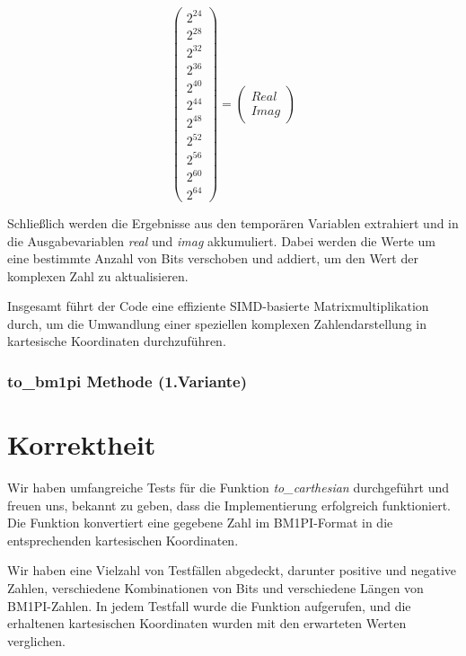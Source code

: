 \documentclass[course=erap]{aspdoc}
\begin{document}
\[\begin{pmatrix}
            2^{24} \\
            2^{28} \\
            2^{32} \\
            2^{36} \\
            2^{40} \\
            2^{44} \\
            2^{48} \\
            2^{52} \\
            2^{56} \\
            2^{60} \\
            2^{64}
        \end{pmatrix}
        =
        \begin{pmatrix}
            \textit{Real}\\
            \textit{Imag}
        \end{pmatrix}
    \]
    \newline
    \newline

    Schließlich werden die Ergebnisse aus den temporären Variablen extrahiert und in die Ausgabevariablen \textit{real} und \textit{imag} akkumuliert. Dabei werden die Werte um eine bestimmte Anzahl von Bits verschoben und addiert, um den Wert der komplexen Zahl zu aktualisieren.

    Insgesamt führt der Code eine effiziente SIMD-basierte Matrixmultiplikation durch, um die Umwandlung einer speziellen komplexen Zahlendarstellung in kartesische Koordinaten durchzuführen.

    \subsubsection{to\_bm1pi Methode (1.Variante)}

    \section{Korrektheit}
    Wir haben umfangreiche Tests für die Funktion \textit{to\_carthesian} durchgeführt und freuen uns, bekannt zu geben, dass die Implementierung erfolgreich funktioniert. Die Funktion konvertiert eine gegebene Zahl im BM1PI-Format in die entsprechenden kartesischen Koordinaten.

    Wir haben eine Vielzahl von Testfällen abgedeckt, darunter positive und negative Zahlen, verschiedene Kombinationen von Bits und verschiedene Längen von BM1PI-Zahlen. In jedem Testfall wurde die Funktion aufgerufen, und die erhaltenen kartesischen Koordinaten wurden mit den erwarteten Werten verglichen.
\end{document}
